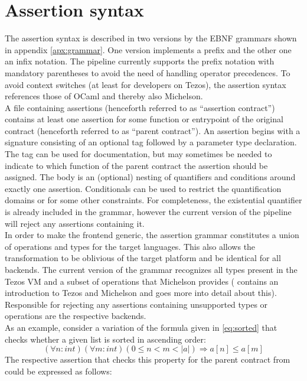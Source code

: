 \section{Assertion syntax}\label{sec:syntax}
The assertion syntax is described in two versions by the EBNF grammars shown in appendix \ref{apx:grammar}. One version implements a prefix and the other one an infix notation. The pipeline currently supports the prefix notation with mandatory parentheses to avoid the need of handling operator precedences. To avoid context switches (at least for developers on Tezos), the assertion syntax references those of OCaml and thereby also Michelson.\\
A file containing assertions (henceforth referred to as ``assertion contract'') contains at least one assertion for some function or entrypoint of the original contract (henceforth referred to as ``parent contract''). An assertion begins with a signature consisting of an optional tag followed by a parameter type declaration. The tag can be used for documentation, but may sometimes be needed to indicate to which function of the parent contract the assertion should be assigned. The body is an (optional) nesting of quantifiers and conditions around exactly one assertion. Conditionals can be used to restrict the quantification domains or for some other constraints. For completeness, the existential quantifier is already included in the grammar, however the current version of the pipeline will reject any assertions containing it. \\
In order to make the frontend generic, the assertion grammar constitutes a union of operations and types for the target languages. This also allows the transformation to be oblivious of the target platform and be identical for all backends. The current version of the grammar recognizes all types present in the Tezos VM and a subset of operations that Michelson provides (  contains an introduction to Tezos and Michelson and goes more into detail about this). Responsible for rejecting any assertions containing unsupported types or operations are the respective backends.\\

As an example, consider a variation of the formula given in \eqref{eq:sorted} that checks whether a given list is sorted in ascending order:
\begin{equation}\label{eq:sorted_v2}
	(\forall n : int)(\forall m : int) (0 \leq n < m < |a|) \Rightarrow a[n] \leq a[m]
\end{equation}
The respective assertion that checks this property for the parent contract from  could be expressed as follows:


